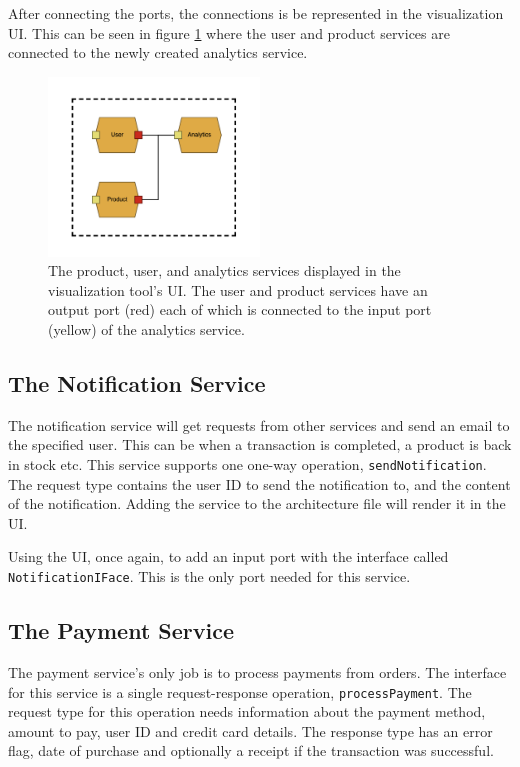After connecting the ports, the connections is be represented in the visualization UI. This can be seen in figure \ref*{figure:jv_analytics} where the user and product services are connected to the newly created analytics service.

\begin{figure}[h!]
    \center
    \includegraphics[width=0.5\textwidth]{figures/jv_analytics.png}
    \caption{The product, user, and analytics services displayed in the visualization tool's UI. The user and product services have an output port (red) each of which is connected to the input port (yellow) of the analytics service.}
    \label{figure:jv_analytics}
\end{figure}

\subsection{The Notification Service}
The notification service will get requests from other services and send an email to the specified user. This can be when a transaction is completed, a product is back in stock etc.
This service supports one one-way operation, \texttt{sendNotification}. The request type contains the user ID to send the notification to, and the content of the notification.
Adding the service to the architecture file will render it in the UI.

Using the UI, once again, to add an input port with the interface called \texttt{NotificationIFace}. This is the only port needed for this service.

\subsection{The Payment Service}
The payment service's only job is to process payments from orders. The interface for this service is a single request-response operation, \texttt{processPayment}.
The request type for this operation needs information about the payment method, amount to pay, user ID and credit card details. The response type has an error flag, date of purchase and optionally a receipt if the transaction was successful.

